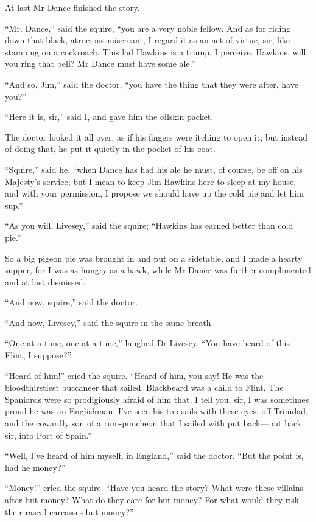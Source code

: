 At last Mr Dance finished the story.

\enquote{Mr. Dance,} said the squire, \enquote{you are a very noble fellow. And as for riding down that black, atrocious miscreant, I regard it as an act of virtue, sir, like stamping on a cockroach. This lad Hawkins is a trump, I perceive. Hawkins, will you ring that bell? Mr Dance must have some ale.}

\enquote{And so, Jim,} said the doctor, \enquote{you have the thing that they were after, have you?}

\enquote{Here it is, sir,} said I, and gave him the oilskin packet.

The doctor looked it all over, as if his fingers were itching to open it; but instead of doing that, he put it quietly in the pocket of his coat.

\enquote{Squire,} said he, \enquote{when Dance has had his ale he must, of course, be off on his Majesty’s service; but I mean to keep Jim Hawkins here to sleep at my house, and with your permission, I propose we should have up the cold pie and let him sup.}

\enquote{As you will, Livesey,} said the squire; \enquote{Hawkins has earned better than cold pie.}

So a big pigeon pie was brought in and put on a sidetable, and I made a hearty supper, for I was as hungry as a hawk, while Mr Dance was further complimented and at last dismissed.

\enquote{And now, squire,} said the doctor.

\enquote{And now, Livesey,} said the squire in the same breath.

\enquote{One at a time, one at a time,} laughed Dr Livesey. \enquote{You have heard of this Flint, I suppose?}

\enquote{Heard of him!} cried the squire. \enquote{Heard of him, you say! He was the bloodthirstiest buccaneer that sailed. Blackbeard was a child to Flint. The Spaniards were so prodigiously afraid of him that, I tell you, sir, I was sometimes proud he was an Englishman. I’ve seen his top-sails with these eyes, off Trinidad, and the cowardly son of a rum-puncheon that I sailed with put back---put back, sir, into Port of Spain.}

\enquote{Well, I’ve heard of him myself, in England,} said the doctor. \enquote{But the point is, had he money?}

\enquote{Money!} cried the squire. \enquote{Have you heard the story? What were these villains after but money? What do they care for but money? For what would they risk their rascal carcasses but money?}

